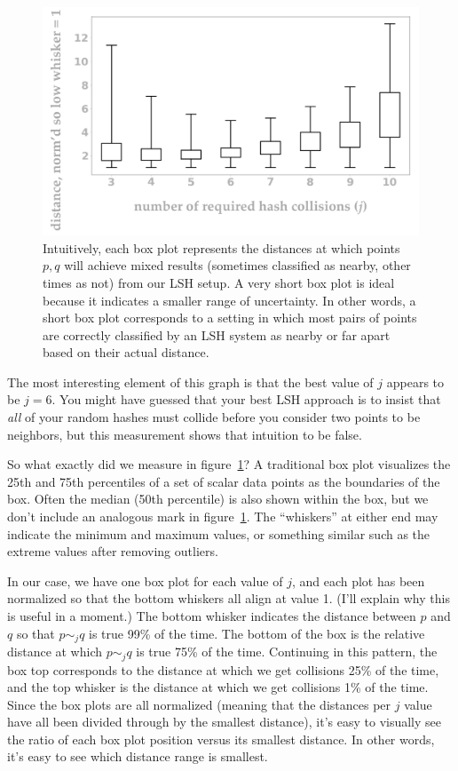 \documentclass[20pt,]{extarticle}
\begin{document}
\begin{figure}
\centering
\includegraphics{images/image9@2x.png}
\caption{Intuitively, each box plot represents the distances at which
points \(p, q\) will achieve mixed results (sometimes classified as
nearby, other times as not) from our LSH setup. A very short box plot is
ideal because it indicates a smaller range of uncertainty. In other
words, a short box plot corresponds to a setting in which most pairs of
points are correctly classified by an LSH system as nearby or far apart
based on their actual distance.}\label{fig:fig9}
\end{figure}

The most interesting element of this graph is that the best value of
\(j\) appears to be \(j=6.\) You might have guessed that your best LSH
approach is to insist that \emph{all} of your random hashes must collide
before you consider two points to be neighbors, but this measurement
shows that intuition to be false.

So what exactly did we measure in figure~\ref{fig:fig9}? A traditional
box plot visualizes the 25th and 75th percentiles of a set of scalar
data points as the boundaries of the box. Often the median (50th
percentile) is also shown within the box, but we don't include an
analogous mark in figure~\ref{fig:fig9}. The ``whiskers'' at either end
may indicate the minimum and maximum values, or something similar such
as the extreme values after removing outliers.

In our case, we have one box plot for each value of \(j\), and each plot
has been normalized so that the bottom whiskers all align at value 1.
(I'll explain why this is useful in a moment.) The bottom whisker
indicates the distance between \(p\) and \(q\) so that \(p\sim_j q\) is
true 99\% of the time. The bottom of the box is the relative distance at
which \(p\sim_j q\) is true 75\% of the time. Continuing in this
pattern, the box top corresponds to the distance at which we get
collisions 25\% of the time, and the top whisker is the distance at
which we get collisions 1\% of the time. Since the box plots are all
normalized (meaning that the distances per \(j\) value have all been
divided through by the smallest distance), it's easy to visually see the
ratio of each box plot position versus its smallest distance. In other
words, it's easy to see which distance range is smallest.
\end{document}
